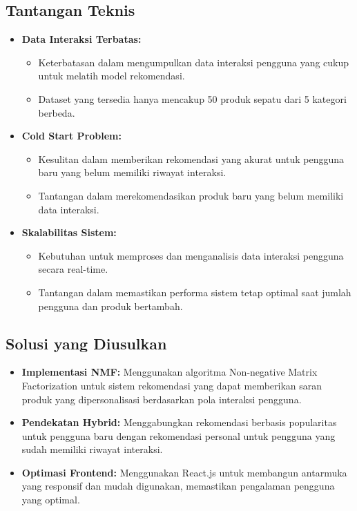 \documentclass[journal,article,submit,pdftex,moreauthors]{Definitions/mdpi}
\begin{document}
\subsection{Tantangan Teknis}
\begin{itemize}
    \item \textbf{Data Interaksi Terbatas:} 
    \begin{itemize}
        \item Keterbatasan dalam mengumpulkan data interaksi pengguna yang cukup untuk melatih model rekomendasi.
        \item Dataset yang tersedia hanya mencakup 50 produk sepatu dari 5 kategori berbeda.
    \end{itemize}
    
    \item \textbf{Cold Start Problem:} 
    \begin{itemize}
        \item Kesulitan dalam memberikan rekomendasi yang akurat untuk pengguna baru yang belum memiliki riwayat interaksi.
        \item Tantangan dalam merekomendasikan produk baru yang belum memiliki data interaksi.
    \end{itemize}
    
    \item \textbf{Skalabilitas Sistem:}
    \begin{itemize}
        \item Kebutuhan untuk memproses dan menganalisis data interaksi pengguna secara real-time.
        \item Tantangan dalam memastikan performa sistem tetap optimal saat jumlah pengguna dan produk bertambah.
    \end{itemize}
\end{itemize}

\subsection{Solusi yang Diusulkan}
\begin{itemize}
    \item \textbf{Implementasi NMF:} Menggunakan algoritma Non-negative Matrix Factorization untuk sistem rekomendasi yang dapat memberikan saran produk yang dipersonalisasi berdasarkan pola interaksi pengguna.
    
    \item \textbf{Pendekatan Hybrid:} Menggabungkan rekomendasi berbasis popularitas untuk pengguna baru dengan rekomendasi personal untuk pengguna yang sudah memiliki riwayat interaksi.
    
    \item \textbf{Optimasi Frontend:} Menggunakan React.js untuk membangun antarmuka yang responsif dan mudah digunakan, memastikan pengalaman pengguna yang optimal.
\end{itemize}
\end{document}
